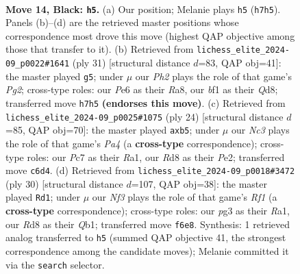 \documentclass[11pt]{article}
\begin{document}
\begin{figure}[p]
\label{fig:thought-m25}
\end{figure}

\clearpage

\begin{figure}[p]\centering
\begin{subfigure}{0.46\textwidth}\centering
\resizebox{\linewidth}{!}{%
\newchessgame
\chessboard[
  setfen={1rbr2k1/p1p1qppp/2n1pn2/2Pp4/1p1P4/1Q2PNP1/PP1B1P1P/2KR1B1R b - - 3 14},
  showmover=false,
  pgfstyle=straightmove, color=movearrow, markmove={h7-h5}
]}
\caption{}
\end{subfigure}\hfill
\begin{subfigure}{0.46\textwidth}\centering
\resizebox{\linewidth}{!}{%
\newchessgame
\chessboard[
  setfen={r2qr1k1/1p1b1pp1/2pp1n1p/p4n2/P1P1pN2/1PP1P1PP/5PB1/R1BQ1RK1 b - - 1 16},
  showmover=false,
  pgfstyle=straightmove, color=movearrow, markmove={g7-g5}
]}
\caption{}
\end{subfigure}
\\[4pt]
\begin{subfigure}{0.46\textwidth}\centering
\resizebox{\linewidth}{!}{%
\newchessgame
\chessboard[
  setfen={1rbq1rk1/2p2pp1/p1n1pb1p/1p6/P1pP4/2N2NP1/1PQ1PPBP/R2R2K1 w - - 0 13},
  showmover=false,
  pgfstyle=straightmove, color=movearrow, markmove={a4-b5}
]}
\caption{}
\end{subfigure}\hfill
\begin{subfigure}{0.46\textwidth}\centering
\resizebox{\linewidth}{!}{%
\newchessgame
\chessboard[
  setfen={rn1qrbk1/2p2bpp/ppp2p2/P3p3/1PP1P3/3PNN2/3B1PPP/RQ3RK1 w - - 1 16},
  showmover=false,
  pgfstyle=straightmove, color=movearrow, markmove={f1-d1}
]}
\caption{}
\end{subfigure}
\caption{\textbf{Move 14, Black: \texttt{h5}.} (a) Our position; Melanie plays \texttt{h5} (\texttt{h7h5}). Panels (b)--(d) are the retrieved master positions whose correspondence most drove this move (highest QAP objective among those that transfer to it). (b) Retrieved from \texttt{lichess\_elite\_2024-09\_p0022\#1641} (ply 31) [structural distance $d$=83, QAP obj=41]: the master played \texttt{g5}; under $\mu$ our \emph{Ph2} plays the role of that game's \emph{Pg2}; cross-type roles: our \emph{P}e6 as their \emph{R}a8, our \emph{b}f1 as their \emph{Q}d8; transferred move \texttt{h7h5} \textbf{(endorses this move)}. (c) Retrieved from \texttt{lichess\_elite\_2024-09\_p0025\#1075} (ply 24) [structural distance $d$=85, QAP obj=70]: the master played \texttt{axb5}; under $\mu$ our \emph{Nc3} plays the role of that game's \emph{Pa4} (a \textbf{cross-type} correspondence); cross-type roles: our \emph{P}c7 as their \emph{R}a1, our \emph{R}d8 as their \emph{P}e2; transferred move \texttt{c6d4}. (d) Retrieved from \texttt{lichess\_elite\_2024-09\_p0018\#3472} (ply 30) [structural distance $d$=107, QAP obj=38]: the master played \texttt{Rd1}; under $\mu$ our \emph{Nf3} plays the role of that game's \emph{Rf1} (a \textbf{cross-type} correspondence); cross-type roles: our \emph{p}g3 as their \emph{R}a1, our \emph{R}d8 as their \emph{Q}b1; transferred move \texttt{f6e8}. Synthesis: 1 retrieved analog transferred to \texttt{h5} (summed QAP objective 41, the strongest correspondence among the candidate moves); Melanie committed it via the \texttt{search} selector.}

\end{figure}
\end{document}
